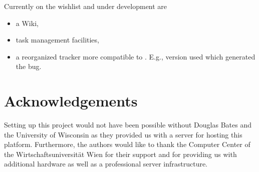 Currently on the wishlist and under development are

\begin{itemize}
\item a Wiki,
\item task management facilities,
\item a reorganized tracker more compatible to \R{}. E.g., \R{}
  version used which generated the bug.
\end{itemize}

\section{Acknowledgements}

Setting up this project would not have been possible without Douglas
Bates and the University of Wisconsin as they provided us with a
server for hosting this platform. Furthermore, 
the authors would like to thank the Computer Center 
of the Wirtschaftsuniversit\"at Wien for
their support and for providing us with additional hardware as well as a
professional server infrastructure.

